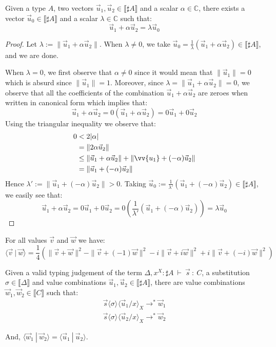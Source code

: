 \documentclass[a4paper,UKenglish,numberwithinsect,pdfa,anonymous]{lipics-v2021}
\theoremstyle{restatestyle}
\newcommand\lra{\longrightarrow}
\newcommand\ansubst[2]{\ensuremath{\langle #1 \rangle_{#2}}}
\def\C{\mathbb{C}}            %
\def\scal#1#2{\langle{#1}~|~{#2}\rangle}
\def\eval{\lra^*}
\def\sem#1{\llbracket#1\rrbracket}
\def\TYP#1#2#3{#1~{\vdash}~#2~{:}~#3}
\begin{document}
\begin{lemma}\label{lem:VecRewrite}%
Given a type $A$, two vectors $\vec{u}_{1},\vec{u}_{2}\in\sem{\sharp A}$ and a scalar $\alpha\in\C$, there exists a vector $\vec{u}_{0}\in\sem{\sharp A}$ and a scalar $\lambda\in\C$ such that:
\[
\vec{u}_{1} + \alpha\vec{u}_{2} = \lambda \vec{u}_{0} 
\]
\end{lemma}
\begin{proof}
    Let $\lambda:=\|\vec{u}_{1}+\alpha\vec{u}_{2}\|$. When $\lambda\neq 0$, we take $\vec{u}_{0}=\frac{1}{\lambda}(\vec{u}_{1}+\alpha\vec{u}_{2})\in\sem{\sharp A}$, and we are done.

    When $\lambda=0$, we first observe that $\alpha\neq 0$ since it would mean that $\|\vec{u}_{1}\|=0$ which is absurd since $\|\vec{u}_{1}\|=1$. Moreover, since $\lambda=\|\vec{u}_{1}+\alpha\vec{u}_{2}\|=0$, we observe that all the coefficients of the combination $\vec{u}_{1}+\alpha\vec{u}_{2}$ are zeroes when written in canonical form which implies that:
    \[
    \vec{u}_{1}+\alpha\vec{u}_{2} = 0(\vec{u}_{1}+\alpha\vec{u}_{2}) = 0\vec{u}_{1}+0\vec{u}_{2}
    \]
    Using the triangular inequality we observe that:
    \begin{align*}
    0 &< 2|\alpha|\\
    &= \|2\alpha\vec{u}_{2}\|\\
    &\leq\|\vec{u}_{1}+\alpha\vec{u}_{2}\| + \|\vv{u_1 }+ (-\alpha)\vec{u}_{2}\|\\
    &= \|\vec{u}_{1}+(-\alpha)\vec{u}_{2}\|
    \end{align*}
    Hence $\lambda' := \|\vec{u}_{1}+(-\alpha)\vec{u}_{2}\|>0$. Taking $\vec{u}_{0}:= \frac{1}{\lambda'}(\vec{u}_{1}+ (-\alpha)\vec{u}_{2})\in\sem{\sharp A}$, we easily see that:
    \[
    \vec{u}_{1}+\alpha\vec{u}_{2} = 0\vec{u}_{1} + 0\vec{u}_{2} = 0(\frac{1}{\lambda'} (\vec{u}_{1} + (-\alpha) \vec{u}_{2})) = \lambda \vec{u}_{0}
    \tag*{\qedhere}
    \]
\end{proof}

\begin{theorem}\label{prop:Polarization} %
For all values $\vec{v}$ and $\vec{w}$ we have:
\[
  \scal{\vec{v}}{\vec{w}}=
  \frac{1}{4} (\|\vec{v}+\vec{w}\|^2 - \|\vec{v} + (-1) \vec{w}\|^2 - i\|\vec{v} + i\vec{w}\|^2 + i\|\vec{v}+ (-i)\vec{w}\|^2)
\]
\end{theorem}

\begin{lemma}\label{lem:InnerProdSingleVar} 
Given a valid typing judgement of the term $\TYP{\Delta,x^X:\sharp A}{\vec{s}}{C}$, a substitution $\sigma\in\sem{\Delta}$ and value combinations $\vec{u}_{1},\vec{u}_{2}\in\sem{\sharp A}$, there are value combinations $\vec{w}_{1}, \vec{w}_{2}\in\sem{C}$ such that:
\[
\begin{array}{c}
    \vec{s}\ansubst{\sigma}{}\ansubst{\vec{u}_{1}/x}{X}\eval\vec{w}_{1}\\
    \vec{s}\ansubst{\sigma}{}\ansubst{\vec{u}_{2}/x}{X}\eval\vec{w}_{2}
\end{array}
\]

And, $\scal{\vec{w}_{1}}{\vec{w}_{2}} = \scal{\vec{u}_{1}}{\vec{u}_{2}}$.
\end{lemma}
\end{document}
